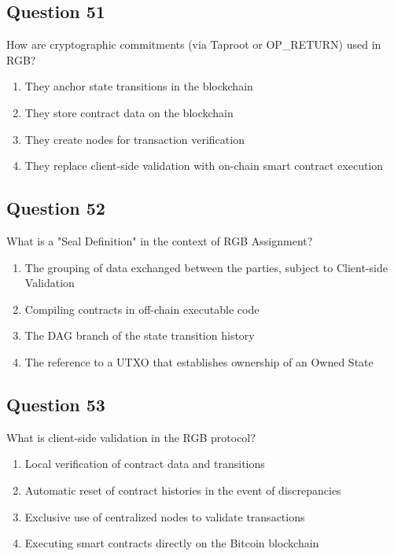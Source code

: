 \documentclass[12pt,a4paper]{article}
\begin{document}
\bigskip


\subsection*{Question 51}
How are cryptographic commitments (via Taproot or OP\_RETURN) used in RGB?

\begin{enumerate}[label=\Alph*., leftmargin=*]
\item They anchor state transitions in the blockchain
\item They store contract data on the blockchain
\item They create nodes for transaction verification
\item They replace client-side validation with on-chain smart contract execution
\end{enumerate}

\bigskip


\subsection*{Question 52}
What is a "Seal Definition" in the context of RGB Assignment?

\begin{enumerate}[label=\Alph*., leftmargin=*]
\item The grouping of data exchanged between the parties, subject to Client-side Validation
\item Compiling contracts in off-chain executable code
\item The DAG branch of the state transition history
\item The reference to a UTXO that establishes ownership of an Owned State
\end{enumerate}

\bigskip


\subsection*{Question 53}
What is client-side validation in the RGB protocol?

\begin{enumerate}[label=\Alph*., leftmargin=*]
\item Local verification of contract data and transitions
\item Automatic reset of contract histories in the event of discrepancies
\item Exclusive use of centralized nodes to validate transactions
\item Executing smart contracts directly on the Bitcoin blockchain
\end{enumerate}
\end{document}
